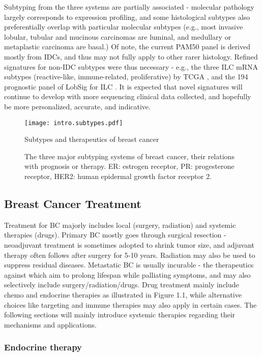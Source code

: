 Subtyping from the three systems are partially associated - molecular pathology largely corresponds to expression profiling, and some histological subtypes also preferentially overlap with particular molecular subtypes (e.g., most invasive lobular, tubular and mucinous carcinomas are luminal, and medullary or metaplastic carcinoma are basal.) Of note, the current PAM50 panel is derived mostly from IDCs, and thus may not fully apply to other rarer histology. Refined signatures for non-IDC subtypes were thus necessary - e.g., the three ILC mRNA subtypes (reactive-like, immune-related, proliferative) by TCGA \citep{ciriello2015comprehensive}, and the 194 prognostic panel of LobSig for ILC \citep{mccart2019lobsig}. It is expected that novel signatures will continue to develop with more sequencing clinical data collected, and hopefully be more personalized, accurate, and indicative. 

\begin{figure}
  \centering
  \texttt{[image: intro.subtypes.pdf]}
  \caption{Subtypes and therapeutics of breast cancer}
  \caption*{The three major subtyping systems of breast cancer, their relations with prognosis or therapy. ER: estrogen receptor, PR: progesterone receptor, HER2: human epidermal growth factor receptor 2.}
  \label{fig:example}
\end{figure}

\subsection{Breast Cancer Treatment}

Treatment for BC majorly includes local (surgery, radiation) and systemic therapies (drugs). Primary BC mostly goes through surgical resection - neoadjuvant treatment is sometimes adopted to shrink tumor size, and adjuvant therapy often follows after surgery for 5-10 years. Radiation may also be used to suppress residual diseases. Metastatic BC is usually incurable - the therapeutics against which aim to prolong lifespan while palliating symptoms, and may also selectively include surgery/radiation/drugs. Drug treatment mainly include chemo and endocrine therapies as illustrated in Figure 1.1, while alternative choices like targeting and immune therapies may also apply in certain cases. The following sections will mainly introduce systemic therapies regarding their mechanisms and applications.

\subsubsection{Endocrine therapy}

